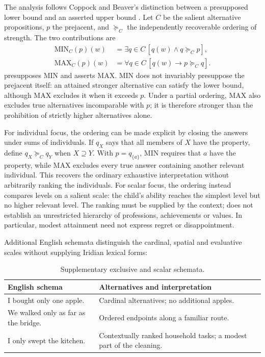 The analysis follows Coppock and Beaver's distinction between a presupposed
lower bound and an asserted upper bound
\cite[§2.3, pp.~392--395]{coppockbeaver2014}. Let $C$ be the salient
alternative propositions, $p$ the prejacent, and $\succeq_C$ the independently
recoverable ordering of strength. The two contributions are
\[
\begin{aligned}
\mathrm{MIN}_C(p)(w)
  &=\exists q\in C\,[q(w)\wedge q\succeq_C p],\\
\mathrm{MAX}_C(p)(w)
  &=\forall q\in C\,[q(w)\rightarrow p\succeq_C q].
\end{aligned}
\]
 presupposes MIN and asserts MAX. MIN does not invariably
presuppose the prejacent itself: an attained stronger alternative can satisfy
the lower bound, although MAX excludes it when it exceeds $p$. Under a partial
ordering, MAX also excludes true alternatives incomparable with $p$; it is
therefore stronger than the prohibition of strictly higher alternatives alone.

For individual focus, the ordering can be made explicit by closing the
answers under sums of individuals. If $q_X$ says that all members of $X$ have
the property, define $q_X\succeq_C q_Y$ when $X\supseteq Y$. With
$p=q_{\{a\}}$, MIN requires that $a$ have the property, while MAX excludes
every true answer containing another relevant individual. This recovers the
ordinary exhaustive interpretation without arbitrarily ranking the individuals.
For scalar focus, the ordering instead compares levels on a salient scale:
the child's ability reaches the simplest level but no higher relevant level.
The ranking must be supplied by the context;  does not establish
an unrestricted hierarchy of professions, achievements or values. In particular,
modest attainment need not express regret or disappointment.

Additional English schemata distinguish the cardinal, spatial and evaluative
scales without supplying Iridian lexical forms:
\begin{table}[ht]
\footnotesize
\caption{Supplementary exclusive and scalar schemata.}
\label{tab:kamo-supplementary-schemata}
\begin{tabularx}{\textwidth}{L L}
\toprule
English schema & Alternatives and interpretation \\
\midrule
I bought only one apple. & Cardinal alternatives; no additional apples. \\
We walked only as far as the bridge. & Ordered endpoints along a familiar route. \\
I only swept the kitchen. & Contextually ranked household tasks; a modest part of the cleaning. \\
\bottomrule
\end{tabularx}
\end{table}

